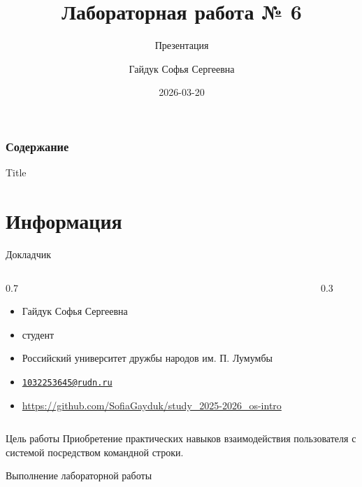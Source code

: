 \documentclass[
  ignorenonframetext,
  aspectratio=169,
]{beamer}
\title{Лабораторная работа № 6}
\subtitle{Презентация}
\author{Гайдук Софья Сергеевна}
\date{2026-03-20}
\providecommand{\tightlist}{%
  \setlength{\itemsep}{0pt}\setlength{\parskip}{0pt}}\usepackage{longtable,booktabs,array}
\renewcommand*\contentsname{Table of contents}
\newcommand\contentsname{Table of contents}
\begin{document}
\frame{\titlepage}

\renewcommand*\contentsname{Содержание}
\begin{frame}[allowframebreaks]
  \frametitle{Содержание}
  \setcounter{tocdepth}{1}
  \tableofcontents
\end{frame}

\begin{frame}{Title}
\label{title}
\end{frame}

\section{Информация}\label{ux438ux43dux444ux43eux440ux43cux430ux446ux438ux44f}

\begin{frame}{Докладчик}
\label{ux434ux43eux43aux43bux430ux434ux447ux438ux43a}
\begin{columns}[c]
\begin{column}{0.7\linewidth}
\begin{itemize}[<+->]
\tightlist
\item
  Гайдук Софья Сергеевна
\item
  студент
\item
  Российский университет дружбы народов им. П. Лумумбы
\item
  \href{mailto:1032253645@rudn.ru}{\nolinkurl{1032253645@rudn.ru}}
\item
  \url{https://github.com/SofiaGayduk/study_2025-2026_os-intro}
\end{itemize}
\end{column}

\begin{column}{0.3\linewidth}
\end{column}
\end{columns}
\end{frame}

\begin{frame}{Цель работы}
\label{ux446ux435ux43bux44c-ux440ux430ux431ux43eux442ux44b}
Приобретение практических навыков взаимодействия пользователя с системой
посредством командной строки.
\end{frame}

\begin{frame}{Выполнение лабораторной работы}
\label{ux432ux44bux43fux43eux43bux43dux435ux43dux438ux435-ux43bux430ux431ux43eux440ux430ux442ux43eux440ux43dux43eux439-ux440ux430ux431ux43eux442ux44b}
\end{frame}
\end{document}
